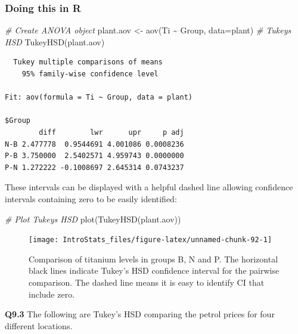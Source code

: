\documentclass[
  oneside]{krantz}
\newenvironment{Shaded}{\begin{snugshade}}{\end{snugshade}}
\newcommand{\AttributeTok}[1]{\textcolor[rgb]{0.77,0.63,0.00}{#1}}
\newcommand{\CommentTok}[1]{\textcolor[rgb]{0.56,0.35,0.01}{\textit{#1}}}
\newcommand{\FunctionTok}[1]{\textcolor[rgb]{0.00,0.00,0.00}{#1}}
\newcommand{\NormalTok}[1]{#1}
\newcommand{\OtherTok}[1]{\textcolor[rgb]{0.56,0.35,0.01}{#1}}
\newcommand{\SpecialCharTok}[1]{\textcolor[rgb]{0.00,0.00,0.00}{#1}}
\begin{document}
\hypertarget{doing-this-in-r-17}{%
\subsubsection{Doing this in R}\label{doing-this-in-r-17}}

\begin{Shaded}
\begin{Highlighting}[]
\CommentTok{\# Create ANOVA object}
\NormalTok{plant.aov }\OtherTok{\textless{}{-}} \FunctionTok{aov}\NormalTok{(Ti }\SpecialCharTok{\textasciitilde{}}\NormalTok{ Group, }\AttributeTok{data=}\NormalTok{plant)}
\CommentTok{\# Tukeys HSD}
\FunctionTok{TukeyHSD}\NormalTok{(plant.aov)}
\end{Highlighting}
\end{Shaded}

\begin{verbatim}
  Tukey multiple comparisons of means
    95% family-wise confidence level

Fit: aov(formula = Ti ~ Group, data = plant)

$Group
        diff        lwr      upr     p adj
N-B 2.477778  0.9544691 4.001086 0.0008236
P-B 3.750000  2.5402571 4.959743 0.0000000
P-N 1.272222 -0.1008697 2.645314 0.0743237
\end{verbatim}

These intervals can be displayed with a helpful dashed line allowing confidence intervals containing zero to be easily identified:

\begin{Shaded}
\begin{Highlighting}[]
\CommentTok{\# Plot Tukeys HSD}
\FunctionTok{plot}\NormalTok{(}\FunctionTok{TukeyHSD}\NormalTok{(plant.aov))}
\end{Highlighting}
\end{Shaded}

\begin{figure}

{\centering \texttt{[image: IntroStats\_files/figure-latex/unnamed-chunk-92-1]} 

}

\caption{Comparison of titanium levels in groups B, N and P. The horizontal black lines indicate Tukey's HSD confidence interval for the pairwise comparison. The dashed line means it is easy to identify CI that include zero.}\label{fig:unnamed-chunk-92}
\end{figure}

\textbf{Q9.3} The following are Tukey's HSD comparing the petrol prices for four different locations.
\end{document}
